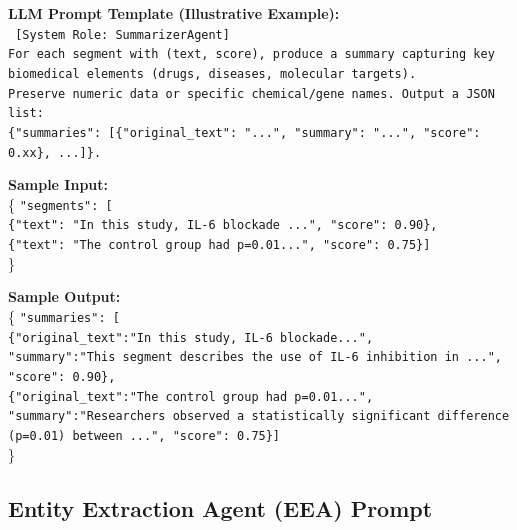 \documentclass{article}
\begin{document}
\begin{tcolorbox}[colframe=black!25, colback=black!5, boxrule=0.5pt, arc=2pt]
\vspace{1mm}
\noindent
\textbf{LLM Prompt Template (Illustrative Example):}\\
\texttt{
[System Role: SummarizerAgent]\\
For each segment with (text, score), produce a summary capturing key biomedical elements (drugs, diseases, molecular targets).\\
Preserve numeric data or specific chemical/gene names. Output a JSON list: \\
\{"summaries": [\{"original\_text": "...", "summary": "...", "score": 0.xx\}, ...]\}.
}

\vspace{1mm}
\noindent
\textbf{Sample Input:}\\
\{
  \texttt{"segments": [}\\
  \quad \texttt{\{"text": "In this study, IL-6 blockade ...", "score": 0.90\},}\\
  \quad \texttt{\{"text": "The control group had p=0.01...", "score": 0.75\}]}\\
\}

\vspace{1mm}
\noindent
\textbf{Sample Output:}\\
\{
  \texttt{"summaries": [}\\
  \quad \texttt{\{"original\_text":"In this study, IL-6 blockade...",}\\
  \quad \quad \texttt{"summary":"This segment describes the use of IL-6 inhibition in ...", "score": 0.90\},}\\
  \quad \texttt{\{"original\_text":"The control group had p=0.01...",}\\
  \quad \quad \texttt{"summary":"Researchers observed a statistically significant difference (p=0.01) between ...", "score": 0.75\}]}\\
\}
\end{tcolorbox}
\newpage

\subsection{Entity Extraction Agent (EEA) Prompt}
\label{appendix:eea_prompt}
\end{document}
